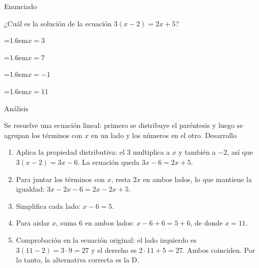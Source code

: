\documentclass[10pt,a4paper,twocolumn]{article}
\newcommand{\alternativa}[2]{\par\noindent\hangindent=1.6em\hangafter=1\makebox[1.6em][l]{\tecla{#1}}#2\par}
\newcommand{\clave}[1]{\par\smallskip{\sffamily\footnotesize\color{esmeralda} Clave \teclaok{#1}}\par}
\begin{document}
\begin{ejemplo}
{\sffamily\footnotesize\color{zinc500} Enunciado}\par
¿Cuál es la solución de la ecuación $3(x-2) = 2x + 5$?
\alternativa{A}{$x = 3$}
\alternativa{B}{$x = 7$}
\alternativa{C}{$x = -1$}
\alternativa{D}{$x = 11$}
\clave{D}
{\sffamily\footnotesize\color{zinc500} Análisis}\par Se resuelve una ecuación lineal: primero se distribuye el paréntesis y luego se agrupan los términos con $x$ en un lado y los números en el otro.
{\sffamily\footnotesize\color{zinc500} Desarrollo}
\begin{enumerate}
  \item Aplica la propiedad distributiva: el $3$ multiplica a $x$ y también a $-2$, así que $3(x-2) = 3x - 6$. La ecuación queda $3x - 6 = 2x + 5$.
  \item Para juntar los términos con $x$, resta $2x$ en ambos lados, lo que mantiene la igualdad: $3x - 2x - 6 = 2x - 2x + 5$.
  \item Simplifica cada lado: $x - 6 = 5$.
  \item Para aislar $x$, suma $6$ en ambos lados: $x - 6 + 6 = 5 + 6$, de donde $x = 11$.
  \item Comprobación en la ecuación original: el lado izquierdo es $3(11-2) = 3\cdot 9 = 27$ y el derecho es $2\cdot 11 + 5 = 27$. Ambos coinciden. Por lo tanto, la alternativa correcta es la D.
\end{enumerate}
\end{ejemplo}
\end{document}
